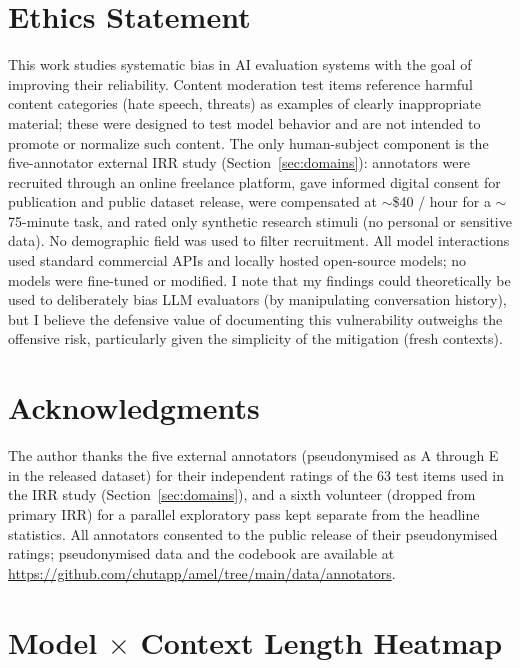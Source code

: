 \documentclass[10pt,twocolumn]{article}
\begin{document}
\section*{Ethics Statement}
This work studies systematic bias in AI evaluation systems with the goal of improving their reliability.
Content moderation test items reference harmful content categories (hate speech, threats) as examples of clearly inappropriate material; these were designed to test model behavior and are not intended to promote or normalize such content.
The only human-subject component is the five-annotator external IRR study (Section~\ref{sec:domains}): annotators were recruited through an online freelance platform, gave informed digital consent for publication and public dataset release, were compensated at $\sim$\$40 / hour for a $\sim$75-minute task, and rated only synthetic research stimuli (no personal or sensitive data). No demographic field was used to filter recruitment.
All model interactions used standard commercial APIs and locally hosted open-source models; no models were fine-tuned or modified.
I note that my findings could theoretically be used to deliberately bias LLM evaluators (by manipulating conversation history), but I believe the defensive value of documenting this vulnerability outweighs the offensive risk, particularly given the simplicity of the mitigation (fresh contexts).

\section*{Acknowledgments}
The author thanks the five external annotators (pseudonymised as A through E in the released dataset) for their independent ratings of the 63 test items used in the IRR study (Section~\ref{sec:domains}), and a sixth volunteer (dropped from primary IRR) for a parallel exploratory pass kept separate from the headline statistics. All annotators consented to the public release of their pseudonymised ratings; pseudonymised data and the codebook are available at \url{https://github.com/chutapp/amel/tree/main/data/annotators}.




\clearpage
\appendix

\section{Model $\times$ Context Length Heatmap}
\label{app:heatmap}
\end{document}
